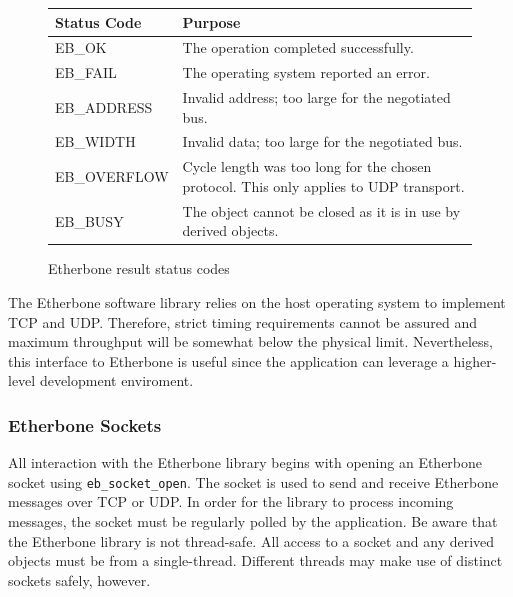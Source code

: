 \documentclass{article}
\begin{document}
\begin{figure}
\centering
\begin{tabular}{|l|p{}|}
\hline
Status Code & Purpose \\
\hline
EB\_OK & 
The operation completed successfully. 
\\
EB\_FAIL & 
The operating system reported an error.
\\
EB\_ADDRESS & 
Invalid address; 
too large for the negotiated bus.
\\
EB\_WIDTH & 
Invalid data; 
too large for the negotiated bus.
\\
EB\_OVERFLOW & 
Cycle length was too long for the chosen protocol.
This only applies to UDP transport.
\\
EB\_BUSY & 
The object cannot be closed as it is in use by derived objects.
\\
\hline
\end{tabular}
\caption{Etherbone result status codes}
\label{fig:status}
\end{figure}

The Etherbone software library relies on the host operating system to
implement TCP and UDP.
Therefore,
strict timing requirements cannot be assured and 
maximum throughput will be somewhat below the physical limit.
Nevertheless, 
this interface to Etherbone is useful since the 
application can leverage a higher-level development enviroment.

\subsubsection{Etherbone Sockets}

All interaction with the Etherbone library begins with opening an Etherbone socket
using \texttt{eb\_socket\_open}.
The socket is used to send and receive Etherbone messages over TCP or UDP.
In order for the library to process incoming messages, 
the socket must be regularly polled by the application.
Be aware that the Etherbone library is not thread-safe.
All access to a socket and any derived objects must be from a single-thread.
Different threads may make use of distinct sockets safely, however.
\end{document}
